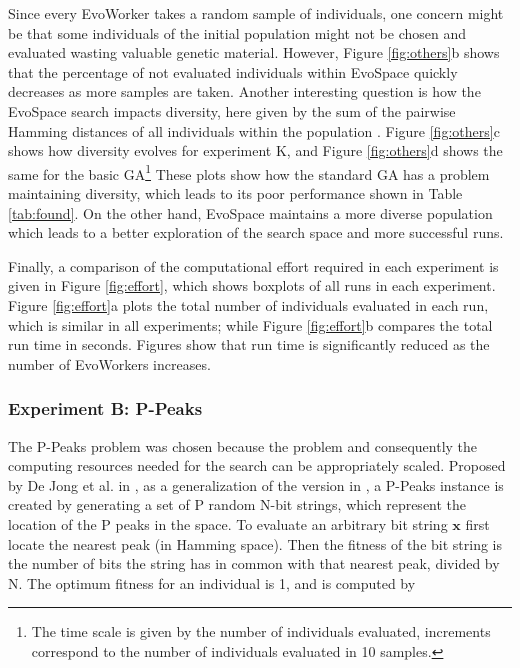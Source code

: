 Since every EvoWorker takes a random sample of individuals, one concern might be that some individuals of the initial population might
not be chosen and evaluated wasting valuable genetic material.
However, Figure \ref{fig:others}b shows that the percentage of not evaluated individuals within EvoSpace quickly decreases as more samples are taken.
Another interesting question is how the EvoSpace search impacts diversity, here given by the sum of the pairwise Hamming distances
of all individuals within the population \cite{diversity}.
Figure \ref{fig:others}c shows how diversity evolves for experiment K, and
Figure \ref{fig:others}d shows the same for the basic GA\footnote{The time scale is given by
the number of individuals evaluated, increments correspond to the number of individuals evaluated in 10 samples.}
These plots show how the standard GA has a problem maintaining diversity, which leads to its poor performance shown in Table \ref{tab:found}.
On the other hand, EvoSpace maintains a more diverse population which leads to a better exploration of the search space and more successful runs.

Finally, a comparison of the computational effort required in each experiment is given in
Figure \ref{fig:effort}, which shows boxplots of all runs in each experiment.
Figure \ref{fig:effort}a plots the total number of individuals evaluated in each run, which is similar in all experiments;
while Figure \ref{fig:effort}b compares the total run time in seconds.
Figures show that run time is significantly reduced as the number of EvoWorkers increases.



\subsubsection{Experiment B: P-Peaks}
The P-Peaks problem was chosen because the problem and consequently the computing resources needed for the search can be appropriately scaled.
Proposed by De Jong et al. in \cite{Jong:PS97}, as a generalization of the version in \cite{Jong:1990}, a
P-Peaks instance is created by generating a set of P random N-bit
strings, which represent the location of the P peaks in the space. To
evaluate an arbitrary bit string \begin{math} \mathbf{x} \end{math}
first locate the nearest peak (in Hamming space). Then the fitness of
the bit string is the number of bits the string has in common with
that nearest peak, divided by N. The optimum fitness for an individual
is 1, and is computed by

